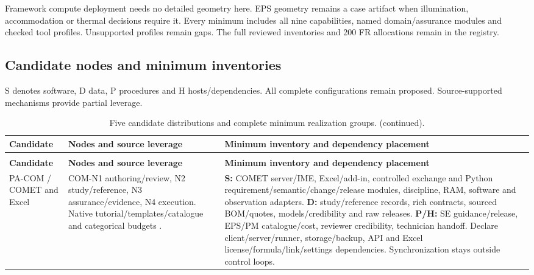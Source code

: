 Framework compute deployment needs no detailed geometry here. EPS geometry remains a case artifact when illumination, accommodation or thermal decisions require it. Every minimum includes all nine capabilities, named domain/assurance modules and checked tool profiles. Unsupported profiles remain gaps. The full reviewed inventories and 200 FR allocations remain in the registry.

\subsection{Candidate nodes and minimum inventories}

S denotes software, D data, P procedures and H hosts/dependencies. All complete configurations remain proposed. Source-supported mechanisms provide partial leverage.
{\small
\setlength{\tabcolsep}{4pt}
\setlength{\parskip}{0pt}
\setlength{\LTpre}{0.4\baselineskip}
\setlength{\LTpost}{0.4\baselineskip}
\renewcommand{\arraystretch}{1.06}
\begin{longtable}{@{}>{\raggedright\arraybackslash}p{}>{\raggedright\arraybackslash}p{}>{\raggedright\arraybackslash}p{}@{}}
\caption{Five candidate distributions and complete minimum realization groups.}\label{tab:framework-candidate-inventories}\\
\toprule
\textbf{Candidate} & \textbf{Nodes and source leverage} & \textbf{Minimum inventory and dependency placement} \\
\midrule
\endfirsthead
\caption[]{Five candidate distributions and complete minimum realization groups. (continued).}\\
\toprule
\textbf{Candidate} & \textbf{Nodes and source leverage} & \textbf{Minimum inventory and dependency placement} \\
\midrule
\endhead
\bottomrule
\endfoot
PA-COM / COMET and Excel & COM-N1 authoring/review, N2 study/reference, N3 assurance/evidence, N4 execution. Native tutorial/templates/catalogue and categorical budgets \citep[Secs.~3--5]{deutsch2022comet}. & \textbf{S:} COMET server/IME, Excel/add-in, controlled exchange and Python requirement/semantic/change/release modules, discipline, RAM, software and observation adapters. \textbf{D:} study/reference records, rich contracts, sourced BOM/quotes, models/credibility and raw releases. \textbf{P/H:} SE guidance/release, EPS/PM catalogue/cost, reviewer credibility, technician handoff. Declare client/server/runner, storage/backup, API and Excel license/formula/link/settings dependencies. Synchronization stays outside control loops. \\

\end{longtable}}
